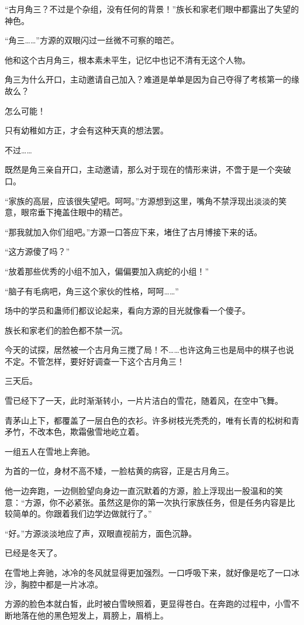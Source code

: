 \begin{this_body}
“古月角三？不过是个杂组，没有任何的背景！”族长和家老们眼中都露出了失望的神色。

“角三……”方源的双眼闪过一丝微不可察的暗芒。

他和这个古月角三，根本素未平生，记忆中也记不清有无这个人物。

角三为什么开口，主动邀请自己加入？难道是单单是因为自己夺得了考核第一的缘故么？

怎么可能！

只有幼稚如方正，才会有这种天真的想法罢。

不过……

既然是角三亲自开口，主动邀请，那么对于现在的情形来讲，不啻于是一个突破口。

“家族的高层，应该很失望吧。呵呵。”方源想到这里，嘴角不禁浮现出淡淡的笑意，眼帘垂下掩盖住眼中的精芒。

“那我就加入你们组吧。”方源一口答应下来，堵住了古月博接下来的话。

“这方源傻了吗？”

“放着那些优秀的小组不加入，偏偏要加入病蛇的小组！”

“脑子有毛病吧，角三这个家伙的性格，呵呵……”

场中的学员和蛊师们都议论起来，看向方源的目光就像看一个傻子。

族长和家老们的脸色都不禁一沉。

今天的试探，居然被一个古月角三搅了局！不……也许这角三也是局中的棋子也说不定。不管怎样，要好好调查一下这个古月角三！

三天后。

雪已经下了一天，此时渐渐转小，一片片洁白的雪花，随着风，在空中飞舞。

青茅山上下，都覆盖了一层白色的衣衫。许多树枝光秃秃的，唯有长青的松树和青矛竹，不改本色，欺霜傲雪地屹立着。

一组五人在雪地上奔驰。

为首的一位，身材不高不矮，一脸枯黄的病容，正是古月角三。

他一边奔跑，一边侧脸望向身边一直沉默着的方源，脸上浮现出一股温和的笑意：“方源，你不必紧张。虽然这是你的第一次执行家族任务，但是任务内容是比较简单的。你跟着我们边学边做就行了。”

“好。”方源淡淡地应了声，双眼直视前方，面色沉静。

已经是冬天了。

在雪地上奔驰，冰冷的冬风就显得更加强烈。一口呼吸下来，就好像是吃了一口冰沙，胸腔中都是一片冰凉。

方源的脸色本就白皙，此时被白雪映照着，更显得苍白。在奔跑的过程中，小雪不断地落在他的黑色短发上，肩膀上，眉梢上。


\end{this_body}
